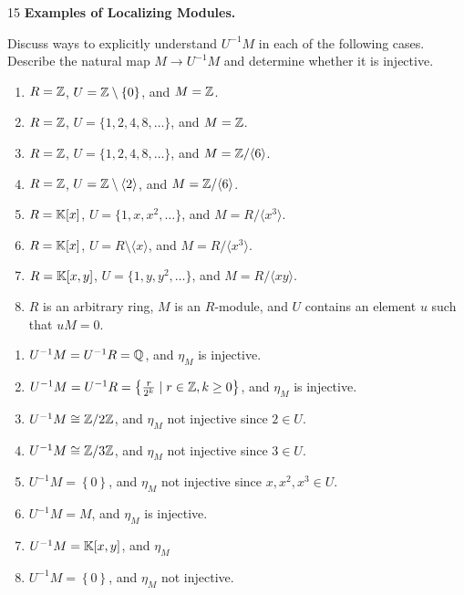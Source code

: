 \documentclass[Notebook.tex]{subfiles}
\begin{document}
\newpage 

\begin{problem}{15}
	\textbf{Examples of Localizing Modules.} 
	
	Discuss ways to explicitly understand $U^{-1}M$ in each of the following cases. Describe the natural map $M\to U^{-1}M$ and determine whether it is injective.

	\begin{enumerate}
		\item $R=\mathbb Z$, $U=\mathbb Z\setminus\{0\}$, and $M=\mathbb Z$.
		\item $R=\mathbb Z$, $U=\{1,2,4,8,\ldots\}$, and $M=\mathbb Z$.
		\item $R=\mathbb Z$, $U=\{1,2,4,8,\ldots\}$, and $M=\mathbb Z/\langle 6\rangle$.
		\item $R=\mathbb Z$, $U=\mathbb Z\setminus \langle 2\rangle$, and $M=\mathbb Z/\langle 6\rangle$.
		\item $R=\mathbb K[x]$, $U=\{1,x,x^2,\ldots\}$, and $M=R/\langle x^3\rangle$.
		\item $R=\mathbb K[x]$, $U=R\setminus \langle x\rangle$, and $M=R/\langle x^3\rangle$.
		\item $R=\mathbb K[x,y]$, $U=\{1,y,y^2,\ldots\}$, and $M=R/\langle xy\rangle$.
		\item $R$ is an arbitrary ring, $M$ is an $R$-module, and $U$ contains an element $u$ such that $uM=0$.
	\end{enumerate}
\end{problem}

\begin{solution}
	\bbni
	\begin{enumerate}
		\item $U^{-1}M = U^{-1}R = \mathbb Q$, and $\eta_M$ is injective. 
		\item $U^{-1}M = U^{-1}R = \left\{\frac{r}{2^k} \mid r \in \mathbb Z, k \geq 0\right\}$, and $\eta_M$ is injective. 
		\item $U^{-1}M  \cong \mathbb Z/2\mathbb Z$, and $\eta_M$ not injective since $2 \in U$. 
		\item $U^{-1}M  \cong \mathbb Z/3\mathbb Z$, and $\eta_M$ not injective since $3 \in U$. 
		\item $U^{-1}M = \left\{0\right\}$, and $\eta_M$ not injective since $x, x^2, x^3 \in U$. 
		\item $U^{-1}M = M$, and $\eta_M$ is injective. 
		\item $U^{-1}M = \mathbb K[x, y]$, and $\eta_M$  \todo{}
		\item $U^{-1}M = \left\{0\right\}$, and $\eta_M$ not injective.
	\end{enumerate}
\end{solution}
\end{document}
